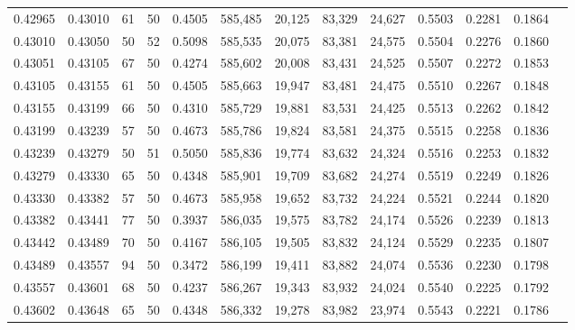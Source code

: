 \begin{tabular}{rrrrrrrrrrrrr}
0.42965 & 0.43010 &    61 &  50 &                                     0.4505 & 585,485 &  20,125 &  83,329 &  24,627 & 0.5503 & 0.2281 & 0.1864 \\
0.43010 & 0.43050 &    50 &  52 &                                     0.5098 & 585,535 &  20,075 &  83,381 &  24,575 & 0.5504 & 0.2276 & 0.1860 \\
0.43051 & 0.43105 &    67 &  50 &                                     0.4274 & 585,602 &  20,008 &  83,431 &  24,525 & 0.5507 & 0.2272 & 0.1853 \\
0.43105 & 0.43155 &    61 &  50 &                                     0.4505 & 585,663 &  19,947 &  83,481 &  24,475 & 0.5510 & 0.2267 & 0.1848 \\
0.43155 & 0.43199 &    66 &  50 &                                     0.4310 & 585,729 &  19,881 &  83,531 &  24,425 & 0.5513 & 0.2262 & 0.1842 \\
0.43199 & 0.43239 &    57 &  50 &                                     0.4673 & 585,786 &  19,824 &  83,581 &  24,375 & 0.5515 & 0.2258 & 0.1836 \\
0.43239 & 0.43279 &    50 &  51 &                                     0.5050 & 585,836 &  19,774 &  83,632 &  24,324 & 0.5516 & 0.2253 & 0.1832 \\
0.43279 & 0.43330 &    65 &  50 &                                     0.4348 & 585,901 &  19,709 &  83,682 &  24,274 & 0.5519 & 0.2249 & 0.1826 \\
0.43330 & 0.43382 &    57 &  50 &                                     0.4673 & 585,958 &  19,652 &  83,732 &  24,224 & 0.5521 & 0.2244 & 0.1820 \\
0.43382 & 0.43441 &    77 &  50 &                                     0.3937 & 586,035 &  19,575 &  83,782 &  24,174 & 0.5526 & 0.2239 & 0.1813 \\
0.43442 & 0.43489 &    70 &  50 &                                     0.4167 & 586,105 &  19,505 &  83,832 &  24,124 & 0.5529 & 0.2235 & 0.1807 \\
0.43489 & 0.43557 &    94 &  50 &                                     0.3472 & 586,199 &  19,411 &  83,882 &  24,074 & 0.5536 & 0.2230 & 0.1798 \\
0.43557 & 0.43601 &    68 &  50 &                                     0.4237 & 586,267 &  19,343 &  83,932 &  24,024 & 0.5540 & 0.2225 & 0.1792 \\
0.43602 & 0.43648 &    65 &  50 &                                     0.4348 & 586,332 &  19,278 &  83,982 &  23,974 & 0.5543 & 0.2221 & 0.1786 \\

\end{tabular}
